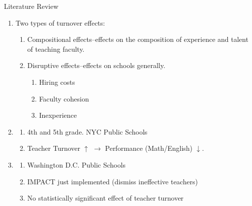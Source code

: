 \documentclass[notes]{beamer}
\begin{document}
\begin{frame}{Literature Review}
\begin{enumerate}[I]
    \item Two types of turnover effects:
    \begin{enumerate}[i]
        \item Compositional effects--effects on the composition of experience and talent of teaching faculty.
        \item Disruptive effects--effects on schools generally.
        \begin{enumerate}
            \item Hiring costs
            \item Faculty cohesion
            \item Inexperience
        \end{enumerate}
    \end{enumerate}
    \item \cite{ronfeldt}
    \begin{enumerate}[i]
        \item 4th and 5th grade. NYC Public Schools
        \item Teacher Turnover $\uparrow$ $\rightarrow$ Performance (Math/English) $\downarrow$.
    \end{enumerate}
    \item \cite{adnot}
    \begin{enumerate}[i]
        \item Washington D.C. Public Schools
        \item IMPACT just implemented (dismiss ineffective teachers)
        \item No statistically significant effect of teacher turnover
    \end{enumerate}
\end{enumerate}  
\end{frame}
\end{document}
